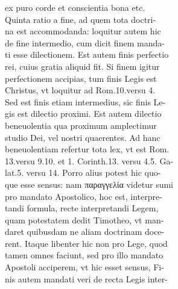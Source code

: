 \documentclass{article}
\begin{document}
\begin{pages}
                ex puro corde et conscientia bona etc. \\
                Quinta ratio a fine, ad quem tota doctri- \\
                na est accommodanda: loquitur autem hic \\
                de fine intermedio, cum dicit finem manda- \\
                ti esse dilectionem. Est autem finis perfectio \\
                rei, cuius gratia aliquid fit. Si finem igitur \\
                perfectionem accipias, tum finis Legis est \\
                Christus, vt loquitur ad Rom.10.versu 4. \\
                Sed est finis etiam intermedius, sic finis Le- \\
                gis est dilectio proximi. Est autem dilectio \\
                beneuolentia qua proximum amplectimur \\
                studio Dei, vel nostri quaerentes. Ad hanc \\
                beneuolentiam refertur tota lex, vt est Rom. \\
                13.versu 9.10. et 1. Corinth.13. versu 4.5. Ga- \\
                lat.5. versu 14. Porro alius potest hic quo- \\
                que esse sensus: nam παραγγελία videtur sumi \\
                pro mandato Apostolico, hoc est, interpre- \\
                tandi formula, recte interpretandi Legem, \\
                quam potestatem dedit Timotheo, vt man- \\
                daret quibusdam ne aliam doctrinam doce- \\
                rent. Itaque libenter hic non pro Lege, quod \\
                tamen omnes faciunt, sed pro illo mandato \\
                Apostoli acciperem, vt hic esset sensus, Fi- \\
                nis autem mandati veri de recta Legis inter- \\

\end{pages}
\end{document}
